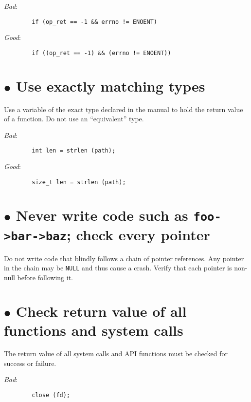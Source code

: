 \documentclass{article}[12pt]
\begin{document}
\textsl{Bad}:

\begin{verbatim}
        if (op_ret == -1 && errno != ENOENT)
\end{verbatim}

\textsl{Good}:

\begin{verbatim}
        if ((op_ret == -1) && (errno != ENOENT))
\end{verbatim}

\section*{$\bullet$ Use exactly matching types}
Use a variable of the exact type declared in the manual to hold the
return value of a function. Do not use an ``equivalent'' type.

\vspace{2ex}

\textsl{Bad}:

\begin{verbatim}
        int len = strlen (path);
\end{verbatim}

\textsl{Good}:

\begin{verbatim}
        size_t len = strlen (path);
\end{verbatim}

\section*{$\bullet$ Never write code such as \texttt{foo->bar->baz}; check every pointer}
Do not write code that blindly follows a chain of pointer
references. Any pointer in the chain may be \texttt{NULL} and thus
cause a crash. Verify that each pointer is non-null before following
it.

\section*{$\bullet$ Check return value of all functions and system calls}
The return value of all system calls and API functions must be checked
for success or failure.

\vspace{2ex}
\textsl{Bad}:

\begin{verbatim}
        close (fd);
\end{verbatim}
\end{document}
